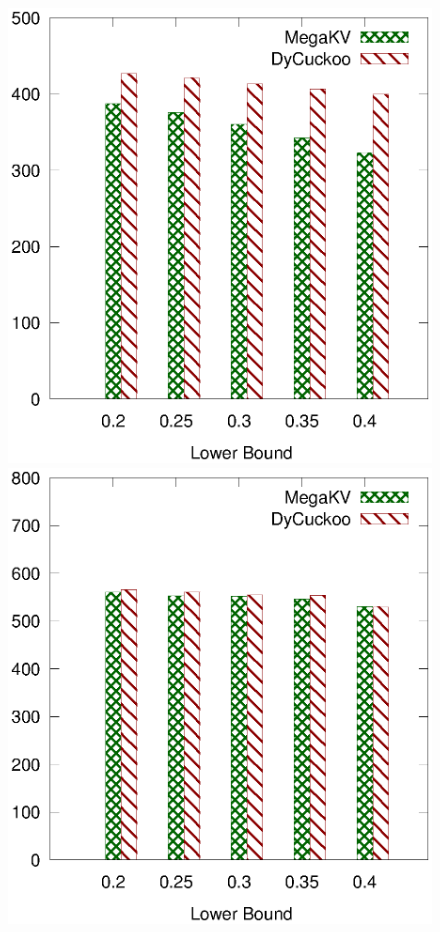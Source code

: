 \begin{figure}[htp]
\begin{minipage}{0.19\linewidth}
		\centerline{\dsreddit}
	\end{minipage}
	\begin{minipage}{0.19\linewidth}\centering
		\includegraphics[width=\linewidth]{pic/dynamic/lower/dynamic_tpch.eps}
		\centerline{\dstpch}
	\end{minipage}
	\begin{minipage}{0.19\linewidth}\centering
		\includegraphics[width=\linewidth]{pic/dynamic/lower/dynamic_ali.eps}

\end{minipage}
\end{figure}
